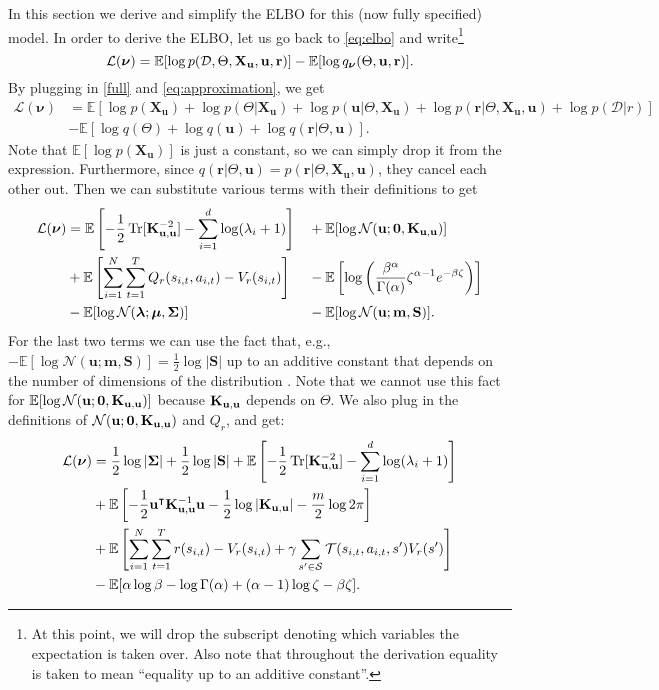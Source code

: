 \documentclass{mprop}
\theoremstyle{definition}
\DeclareMathOperator{\Tr}{Tr}
\begin{document}
In this section we derive and simplify the ELBO for this (now fully specified)
model. In order to derive the ELBO, let us go back to \eqref{eq:elbo} and
write\footnote{At this point, we will drop the subscript denoting which
  variables the expectation is taken over. Also note that throughout the derivation
  equality is taken to mean ``equality up to an additive constant''.}
\[ \mathcal{L}(\bm\nu) = \mathbb{E}[\log p(\mathcal{D}, \Theta, \mathbf{X_u}, \mathbf{u}, \mathbf{r})] -
  \mathbb{E}[\log q_{\bm\nu}(\Theta, \mathbf{u}, \mathbf{r})]. \]
By plugging in \eqref{full} and \eqref{eq:approximation}, we get
\[
  \begin{split}
    \mathcal{L}(\bm\nu) &= \mathbb{E}[\log p(\mathbf{X_u}) + \log p(\Theta |
    \mathbf{X_u}) + \log p(\mathbf{u} | \Theta, \mathbf{X_u}) + \log
    p(\mathbf{r} | \Theta, \mathbf{X_u}, \mathbf{u}) + \log p(\mathcal{D} | r)] \\
    &- \mathbb{E}[\log q(\Theta) + \log q(\mathbf{u}) + \log q(\mathbf{r} |
    \Theta, \mathbf{u})].
  \end{split}
\]
Note that $\mathbb{E}[\log p(\mathbf{X_u})]$ is just a constant, so we can
simply drop it from the expression. Furthermore, since $q(\mathbf{r} | \Theta,
\mathbf{u}) = p(\mathbf{r} | \Theta, \mathbf{X_u}, \mathbf{u})$, they cancel
each other out. Then we can substitute various terms with their definitions to
get
\begin{alignat*}{3}
  \mathcal{L}(\bm\nu) &= \mathbb{E}\left[-\frac{1}{2}\Tr[\Kuu^{-2}] -
    \sum_{i=1}^d \log(\lambda_i + 1)\right] &&+ \mathbb{E}[\log
  \mathcal{N}(\mathbf{u}; \mathbf{0}, \Kuu)] \\
  &+ \mathbb{E}\left[ \sum_{i=1}^N \sum_{t=1}^T Q_r(s_{i,t}, a_{i,t}) -
    V_r(s_{i,t}) \right] &&-
  \mathbb{E}\left[\log\left(\frac{\beta^\alpha}{\Gamma(\alpha)}\zeta^{\alpha -
        1}e^{-\beta\zeta}\right)\right] \\
  &- \mathbb{E}[\log\mathcal{N}(\bm\lambda; \bm\mu, \bm\Sigma)] &&-
  \mathbb{E}[\log\mathcal{N}(\mathbf{u}; \mathbf{m}, \mathbf{S})].
\end{alignat*}
For the last two terms we can use the fact that, e.g., $-\mathbb{E}[\log
\mathcal{N}(\mathbf{u}; \mathbf{m}, \mathbf{S})] = \frac{1}{2}\log|\mathbf{S}|$
up to an additive constant that depends on the number of dimensions of the
distribution \cite{DBLP:journals/tit/AhmedG89}. Note that we cannot use this
fact for $\mathbb{E}[\log \mathcal{N}(\mathbf{u}; \mathbf{0}, \mathbf{K}_{\mathbf{u},\mathbf{u}})]$  because
$\mathbf{K}_{\mathbf{u},\mathbf{u}}$ depends on $\Theta$. We also plug in the definitions of
$\mathcal{N}(\mathbf{u}; \mathbf{0}, \mathbf{K}_{\mathbf{u},\mathbf{u}})$ and $Q_r$, and get:
\begin{align*}
  \mathcal{L}(\bm\nu) &= \frac{1}{2}\log|\bm\Sigma| + \frac{1}{2}\log|\mathbf{S}| + \mathbb{E}\left[-\frac{1}{2}\Tr[\Kuu^{-2}] - \sum_{i=1}^d \log(\lambda_i + 1)\right] \\
  &+ \mathbb{E}\left[-\frac{1}{2}\mathbf{u}^\intercal\Kuu^{-1}\mathbf{u} -
    \frac{1}{2}\log|\Kuu| - \frac{m}{2}\log 2\pi\right] \\
  &+ \mathbb{E}\left[\sum_{i=1}^N \sum_{t=1}^T r(s_{i,t}) - V_r(s_{i,t}) + \gamma\sum_{s' \in \mathcal{S}}
    \mathcal{T}(s_{i,t}, a_{i,t}, s')V_r(s') \right] \\
  &- \mathbb{E}[\alpha\log\beta - \log\Gamma(\alpha) + (\alpha - 1)\log\zeta - \beta\zeta].
\end{align*}
\end{document}

